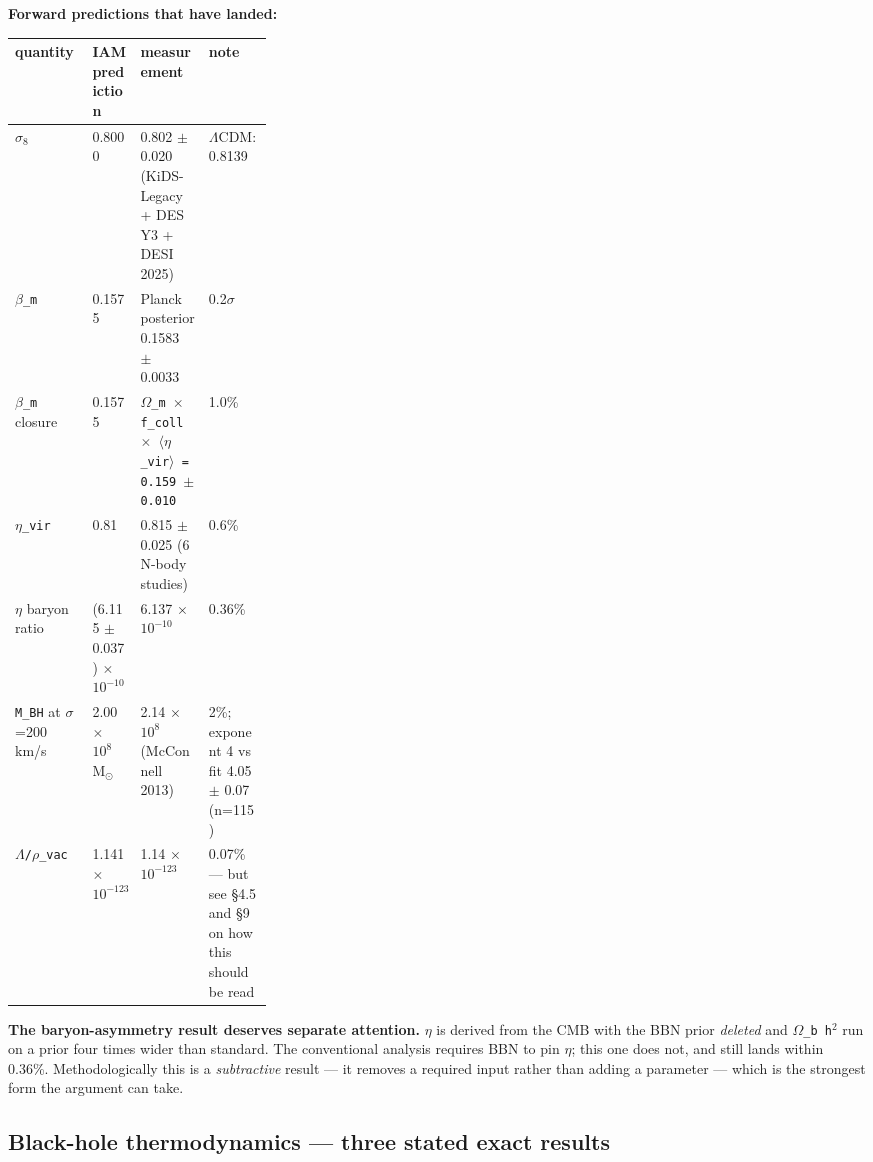 \documentclass[12pt,a4paper]{article}
\begin{document}
\textbf{Forward predictions that have landed:}


\begin{small}
\begin{tabularx}{\linewidth}{L{0.30\linewidth}YYY}
\toprule
\textbf{quantity} & \textbf{IAM prediction} & \textbf{measurement} & \textbf{note} \\
\midrule
\texttt{$\sigma_{8}$} & 0.8000 & 0.802 $\pm$ 0.020 (KiDS-Legacy + DES Y3 + DESI 2025) & $\Lambda$CDM: 0.8139 \\
\texttt{$\beta$\_\allowbreak{}m} & 0.1575 & Planck posterior 0.1583 $\pm$ 0.0033 & 0.2$\sigma$ \\
\texttt{$\beta$\_\allowbreak{}m} closure & 0.1575 & \texttt{$\Omega$\_\allowbreak{}m $\times$ f\_\allowbreak{}coll $\times$ $\langle\eta$\_\allowbreak{}vir$\rangle$ = 0.159 $\pm$ 0.010} & 1.0\% \\
\texttt{$\eta$\_\allowbreak{}vir} & 0.81 & 0.815 $\pm$ 0.025 (6 N-body studies) & 0.6\% \\
\texttt{$\eta$} baryon ratio & (6.115 $\pm$ 0.037) $\times$ $10^{-10}$ & 6.137 $\times$ $10^{-10}$ & 0.36\% \\
\texttt{M\_\allowbreak{}BH} at $\sigma$=200 km/s & 2.00 $\times$ $10^{8}$ M$_{\odot}$ & 2.14 $\times$ $10^{8}$ (McConnell 2013) & 2\%; exponent 4 vs fit 4.05 $\pm$ 0.07 (n=115) \\
\texttt{$\Lambda$/\allowbreak{}$\rho$\_\allowbreak{}vac} & 1.141 $\times$ $10^{-123}$ & 1.14 $\times$ $10^{-123}$ & 0.07\% --- but see \S4.5 and \S9 on how this should be read \\
\bottomrule
\end{tabularx}
\end{small}


\textbf{The baryon-asymmetry result deserves separate attention.} \texttt{$\eta$} is derived from the CMB with the BBN prior \textit{deleted} and \texttt{$\Omega$\_b h$^{2}$} run on a prior four times wider than standard. The conventional analysis requires BBN to pin \texttt{$\eta$}; this one does not, and still lands within 0.36\%. Methodologically this is a \textit{subtractive} result --- it removes a required input rather than adding a parameter --- which is the strongest form the argument can take.





\subsection{Black-hole thermodynamics --- three stated exact results}
\end{document}

